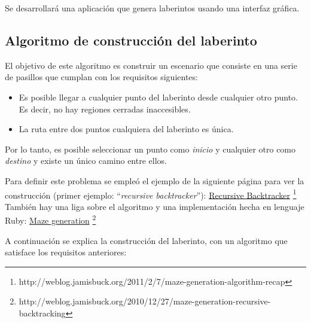 \noindent Se desarrollará una aplicación que genera laberintos usando una interfaz gráfica.

\subsection{Algoritmo de construcci\'on del laberinto}

El objetivo de este algoritmo es construir un escenario que consiste en una serie de pasillos que cumplan con los requisitos siguientes:
\begin{itemize}
 \item Es posible llegar a cualquier punto del laberinto desde cualquier otro punto.  Es decir, no hay regiones cerradas inaccesibles.
 \item La ruta entre dos puntos cualquiera del laberinto es única.
\end{itemize}
Por lo tanto, es posible seleccionar un punto como \textit{inicio} y cualquier otro como \textit{destino} y existe un único camino entre ellos.

Para definir este problema se empleó el ejemplo de la siguiente página para ver la construcción (primer ejemplo: ``\textit{recursive backtracker}''):
\href{http://weblog.jamisbuck.org/2011/2/7/maze-generation-algorithm-recap}{Recursive Backtracker}
\footnote{http://weblog.jamisbuck.org/2011/2/7/maze-generation-algorithm-recap}
También hay una liga sobre el algoritmo y una implementación hecha en lenguaje Ruby:
\href{http://weblog.jamisbuck.org/2010/12/27/maze-generation-recursive-backtracking}{Maze generation}
\footnote{http://weblog.jamisbuck.org/2010/12/27/maze-generation-recursive-backtracking}

\noindent A continuación se explica la construcción del laberinto, con un algoritmo que satisface los requisitos anteriores:

